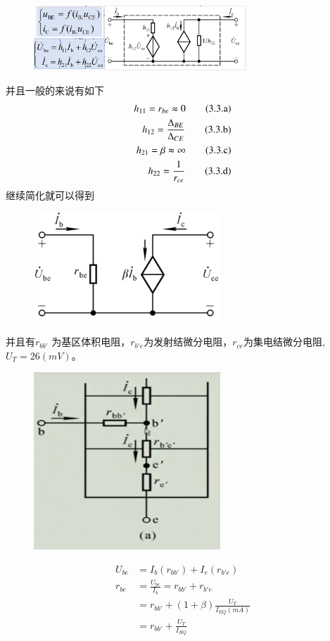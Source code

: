 \begin{figure}[H]
            \centering
            \includegraphics[width=8cm]{img/2.9.png}
            \end{figure}
并且一般的来说有如下
\begin{align}
 h_{11}=r_{be}\thickapprox 0\tag{3.3.a} \\
 h_{12}=\frac{\Delta_{BE}}{\Delta_{CE}}\tag{3.3.b} \\
 h_{21}=\beta\thickapprox \infty\tag{3.3.c} \\
 h_{22}=\frac{1}{r_{ce}}\tag{3.3.d} 
\end{align}
继续简化就可以得到
\begin{figure}[H]
    \centering
    \includegraphics[width=7cm]{img/2.10.png}
    \end{figure}
并且有$r_{bb'}$ 为基区体积电阻，$r_{b'e}$为发射结微分电阻，$r_{ce}$为集电结微分电阻,$U_T=26(mV)$。
\begin{figure}[H]
    \centering
    \includegraphics[width=7cm]{img/2.12.png}
    \end{figure}
$$ 
\begin{aligned}
    U_{be}&=I_b(r_{bb'})+I_{e}(r_{b'e}) \\
    r_{be}&=\frac{U_{be}}{I_b}=r_{bb'}+r_{b'e}
    \\&=r_{bb'}+(1+ \beta)\frac{U_T}{I_{EQ}(mA)} 
    \\&=r_{bb'}+\frac{U_{T}}{I_{BQ}}
\end{aligned}
$$
